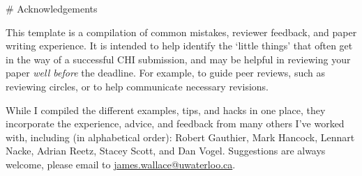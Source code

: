 


\begin{markdown}

# Acknowledgements

This template is a compilation of common mistakes, reviewer feedback, and paper writing experience. It is intended to help identify the `little things' that often get in the way of a successful CHI submission, and may be helpful in reviewing your paper \textit{well before} the deadline. For example, to guide peer reviews, such as reviewing circles, or to help communicate necessary revisions. 

While I compiled the different examples, tips, and hacks in one place, they incorporate the experience, advice, and feedback from many others I've worked with, including (in alphabetical order): Robert Gauthier, Mark Hancock, Lennart Nacke, Adrian Reetz, Stacey Scott, and Dan Vogel. Suggestions are always welcome, please email to \href{mailto:james.wallace@uwaterloo.ca}{james.wallace@uwaterloo.ca}. 

\end{markdown}